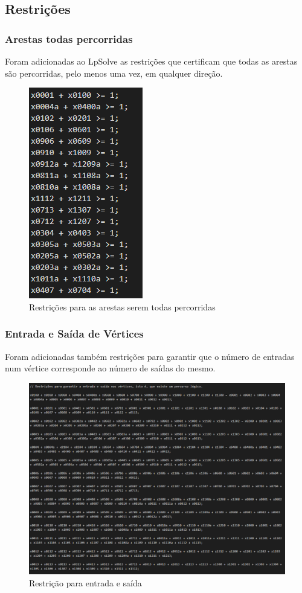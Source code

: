 \subsection{Restrições}

\subsubsection{Arestas todas percorridas}
Foram adicionadas ao LpSolve as restrições que certificam que todas as arestas são percorridas, pelo menos uma vez, em qualquer direção.


\begin{figure}[h!]
\centering
\includegraphics{images/main/restricoesTodasArestas2.png}
\caption{Restrições para as arestas serem todas percorridas}
\end{figure}


\subsubsection{Entrada e Saída de Vértices}
Foram adicionadas também restrições para garantir que o número de entradas num vértice corresponde ao número de saídas do mesmo.

\begin{figure}[h!]
\centering
\includegraphics[width=1\textwidth]{images/main/restricoesEntradaSaida2.png}
\caption{Restrição para entrada e saída}
\end{figure}
\newpage

